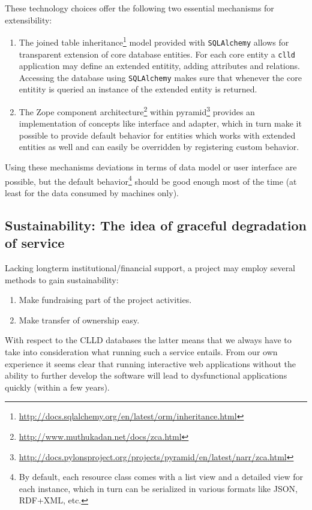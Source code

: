 \documentclass[a4paper,10pt]{article}
\begin{document}
These technology choices offer the following two essential mechanisms for extensibility:
\begin{enumerate}
\item The joined table inheritance\footnote{\url{http://docs.sqlalchemy.org/en/latest/orm/inheritance.html}}
model provided with \texttt{SQLAlchemy} allows for transparent extension of core database entities.
For each core entity a \texttt{clld} application may define an extended entitity, adding attributes and relations.
Accessing the database using \texttt{SQLAlchemy} makes sure
that whenever the core entitity is queried an instance of the extended entity is returned.
\item The Zope component architecture\footnote{\url{http://www.muthukadan.net/docs/zca.html}}
within pyramid\footnote{\url{http://docs.pylonsproject.org/projects/pyramid/en/latest/narr/zca.html}}
provides an implementation of concepts like interface and adapter, which in turn make it possible to provide
default behavior for entities which works with extended entities as well and can easily be overridden
by registering custom behavior.
\end{enumerate}

Using these mechanisms deviations in terms of data model or user interface are possible, but the
default behavior\footnote{By default, each resource class comes with a list view and a detailed view
for each instance, which in turn can be serialized in various formats like JSON, RDF+XML, etc.}
should be good enough most of the time (at least for the data consumed by machines only).

\subsection{Sustainability: The idea of graceful degradation of service}
\label{sec:sustainability}
Lacking longterm institutional/financial support, a project may employ several methods to gain sustainability:
\begin{enumerate}
\item Make fundraising part of the project activities.
\item Make transfer of ownership easy.
\end{enumerate}

With respect to the CLLD databases the latter means that we always have to take into
consideration what running such a service entails. From our own experience it seems
clear that running interactive web applications without the ability to further develop
the software will lead to dysfunctional applications quickly (within a few years).
\end{document}
